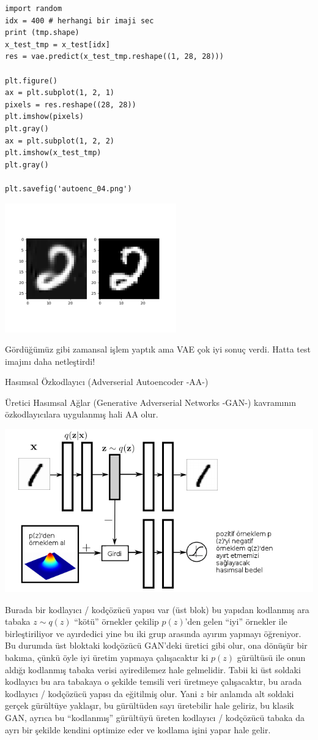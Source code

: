 \documentclass[12pt,fleqn]{article}\usepackage{../../common}
\begin{document}
\begin{verbatim}
import random
idx = 400 # herhangi bir imaji sec
print (tmp.shape)
x_test_tmp = x_test[idx]
res = vae.predict(x_test_tmp.reshape((1, 28, 28)))

plt.figure()
ax = plt.subplot(1, 2, 1)
pixels = res.reshape((28, 28))
plt.imshow(pixels)
plt.gray()
ax = plt.subplot(1, 2, 2)
plt.imshow(x_test_tmp)
plt.gray()

plt.savefig('autoenc_04.png')
\end{verbatim}

\includegraphics[width=20em]{autoenc_04.png}

Gördüğümüz gibi zamansal işlem yaptık ama VAE çok iyi sonuç verdi. Hatta
test imajını daha netleştirdi!

Hasımsal Özkodlayıcı (Adverserial Autoencoder -AA-)

Üretici Hasımsal Ağlar (Generative Adverserial Networks -GAN-) kavramının
özkodlayıcılara uygulanmış hali AA olur. 

\includegraphics[width=40em]{autoenc_09.png}

Burada bir kodlayıcı / kodçözücü yapısı var (üst blok) bu yapıdan kodlanmış ara
tabaka $z \sim q(z)$ ``kötü'' örnekler çekilip $p(z)$'den gelen ``iyi'' örnekler
ile birleştiriliyor ve ayırdedici yine bu iki grup arasında ayırım yapmayı
öğreniyor. Bu durumda üst bloktaki kodçözücü GAN'deki üretici gibi olur, ona
dönüşür bir bakıma, çünkü öyle iyi üretim yapmaya çalışacaktır ki $p(z)$
gürültüsü ile onun aldığı kodlanmış tabaka verisi ayiredilemez hale gelmelidir.
Tabii ki üst soldaki kodlayıcı bu ara tabakaya o şekilde temsili veri üretmeye
çalışacaktır, bu arada kodlayıcı / kodçözücü yapısı da eğitilmiş olur. Yani $z$
bir anlamda alt soldaki gerçek gürültüye yaklaşır, bu gürültüden sayı üretebilir
hale geliriz, bu klasik GAN, ayrıca bu ``kodlanmış'' gürültüyü üreten kodlayıcı
/ kodçözücü tabaka da ayrı bir şekilde kendini optimize eder ve kodlama işini
yapar hale gelir.
\end{document}
